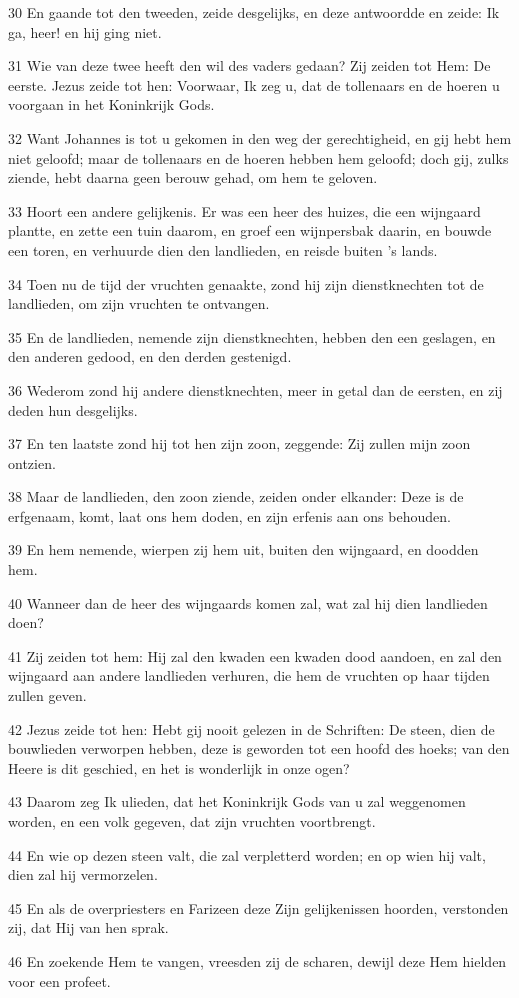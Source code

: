 \par 30 En gaande tot den tweeden, zeide desgelijks, en deze antwoordde en zeide: Ik ga, heer! en hij ging niet.
\par 31 Wie van deze twee heeft den wil des vaders gedaan? Zij zeiden tot Hem: De eerste. Jezus zeide tot hen: Voorwaar, Ik zeg u, dat de tollenaars en de hoeren u voorgaan in het Koninkrijk Gods.
\par 32 Want Johannes is tot u gekomen in den weg der gerechtigheid, en gij hebt hem niet geloofd; maar de tollenaars en de hoeren hebben hem geloofd; doch gij, zulks ziende, hebt daarna geen berouw gehad, om hem te geloven.
\par 33 Hoort een andere gelijkenis. Er was een heer des huizes, die een wijngaard plantte, en zette een tuin daarom, en groef een wijnpersbak daarin, en bouwde een toren, en verhuurde dien den landlieden, en reisde buiten 's lands.
\par 34 Toen nu de tijd der vruchten genaakte, zond hij zijn dienstknechten tot de landlieden, om zijn vruchten te ontvangen.
\par 35 En de landlieden, nemende zijn dienstknechten, hebben den een geslagen, en den anderen gedood, en den derden gestenigd.
\par 36 Wederom zond hij andere dienstknechten, meer in getal dan de eersten, en zij deden hun desgelijks.
\par 37 En ten laatste zond hij tot hen zijn zoon, zeggende: Zij zullen mijn zoon ontzien.
\par 38 Maar de landlieden, den zoon ziende, zeiden onder elkander: Deze is de erfgenaam, komt, laat ons hem doden, en zijn erfenis aan ons behouden.
\par 39 En hem nemende, wierpen zij hem uit, buiten den wijngaard, en doodden hem.
\par 40 Wanneer dan de heer des wijngaards komen zal, wat zal hij dien landlieden doen?
\par 41 Zij zeiden tot hem: Hij zal den kwaden een kwaden dood aandoen, en zal den wijngaard aan andere landlieden verhuren, die hem de vruchten op haar tijden zullen geven.
\par 42 Jezus zeide tot hen: Hebt gij nooit gelezen in de Schriften: De steen, dien de bouwlieden verworpen hebben, deze is geworden tot een hoofd des hoeks; van den Heere is dit geschied, en het is wonderlijk in onze ogen?
\par 43 Daarom zeg Ik ulieden, dat het Koninkrijk Gods van u zal weggenomen worden, en een volk gegeven, dat zijn vruchten voortbrengt.
\par 44 En wie op dezen steen valt, die zal verpletterd worden; en op wien hij valt, dien zal hij vermorzelen.
\par 45 En als de overpriesters en Farizeen deze Zijn gelijkenissen hoorden, verstonden zij, dat Hij van hen sprak.
\par 46 En zoekende Hem te vangen, vreesden zij de scharen, dewijl deze Hem hielden voor een profeet.

